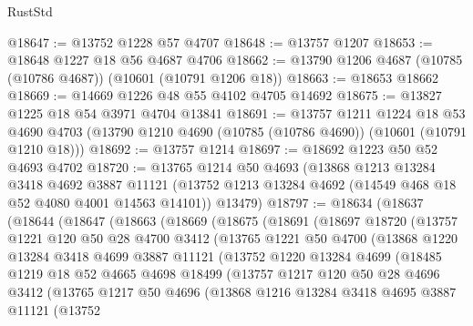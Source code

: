 \begin{lexlean}{RustStd}
\begin{coremodule}
@18647 := @13752 @1228 @57 @4707
@18648 := @13757 @1207
@18653 := @18648 @1227 @18 @56 @4687 @4706
@18662 := @13790 @1206 @4687 (@10785 (@10786 @4687)) (@10601 (@10791 @1206 @18))
@18663 := @18653 @18662
@18669 := @14669 @1226 @48 @55 @4102 @4705 @14692
@18675 := @13827 @1225 @18 @54 @3971 @4704 @13841
@18691 := @13757
    @1211
    @1224
    @18
    @53
    @4690
    @4703
    (@13790 @1210 @4690 (@10785 (@10786 @4690)) (@10601 (@10791 @1210 @18)))
@18692 := @13757 @1214
@18697 := @18692 @1223 @50 @52 @4693 @4702
@18720 := @13765
    @1214
    @50
    @4693
    (@13868
      @1213
      @13284
      @3418
      @4692
      @3887
      @11121
      (@13752 @1213 @13284 @4692 (@14549 @468 @18 @52 @4080 @4001 @14563 @14101))
      @13479)
@18797 := @18634
    (@18637
      (@18644
        (@18647
          (@18663
            (@18669
              (@18675
                (@18691
                  (@18697
                    @18720
                    (@13757
                      @1221
                      @120
                      @50
                      @28
                      @4700
                      @3412
                      (@13765
                        @1221
                        @50
                        @4700
                        (@13868
                          @1220
                          @13284
                          @3418
                          @4699
                          @3887
                          @11121
                          (@13752
                            @1220
                            @13284
                            @4699
                            (@18485
                              @1219
                              @18
                              @52
                              @4665
                              @4698
                              @18499
                              (@13757
                                @1217
                                @120
                                @50
                                @28
                                @4696
                                @3412
                                (@13765
                                  @1217
                                  @50
                                  @4696
                                  (@13868
                                    @1216
                                    @13284
                                    @3418
                                    @4695
                                    @3887
                                    @11121
                                    (@13752

\end{coremodule}
\end{lexlean}
